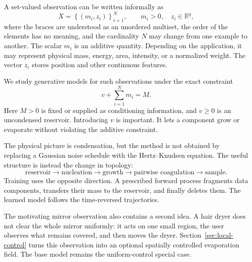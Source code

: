 \documentclass[10pt]{article}
\theoremstyle{definition}
\theoremstyle{remark}
\newcommand{\R}{\mathbb{R}}
\begin{document}
A set-valued observation can be written informally as
\begin{equation}
  X=\left\{(m_i,z_i)\right\}_{i=1}^{N},
  \qquad m_i>0,\quad z_i\in\R^q,
  \label{eq:intro-set}
\end{equation}
where the braces are understood as an unordered multiset, the order of the
elements has no meaning, and the cardinality $N$ may change from one example
to another.  The scalar $m_i$ is an additive quantity.  Depending on the application, it may represent physical mass, energy, area, intensity, or a normalized weight.  The vector $z_i$ stores position and other continuous features.

We study generative models for such observations under the exact constraint
\begin{equation}
  v+\sum_{i=1}^{N}m_i=M.
  \label{eq:mass-constraint-intro}
\end{equation}
Here $M>0$ is fixed or supplied as conditioning information, and $v\geq 0$ is an uncondensed reservoir.  Introducing $v$ is important.  It lets a component grow or evaporate without violating the additive constraint.

The physical picture is condensation, but the method is not obtained by replacing a Gaussian noise schedule with the Hertz--Knudsen equation.  The useful structure is instead the change in topology:
\[
\text{reservoir}
\longrightarrow \text{nucleation}
\longrightarrow \text{growth}
\longrightarrow \text{pairwise coagulation}
\longrightarrow \text{sample}.
\]
Training uses the opposite direction.  A prescribed forward process fragments data components, transfers their mass to the reservoir, and finally deletes them.  The learned model follows the time-reversed trajectories.

The motivating mirror observation also contains a second idea.  A hair dryer
does not clear the whole mirror uniformly: it acts on one small region, the
user observes what remains covered, and then moves the dryer.  Section~\ref{sec:local-control}
turns this observation into an optional spatially controlled evaporation
field.  The base model remains the uniform-control special case.
\end{document}
